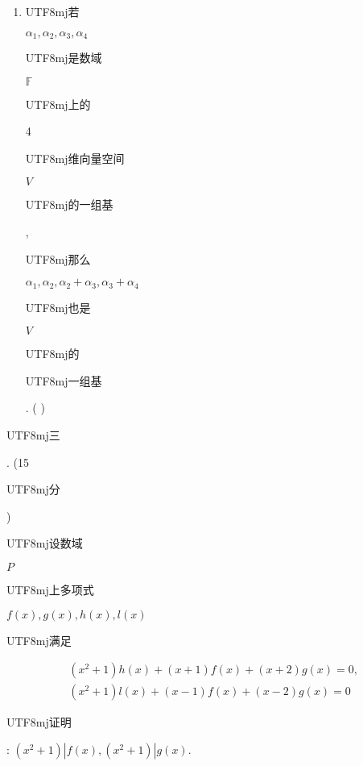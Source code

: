 \documentclass[10pt]{article}
\begin{document}
\begin{enumerate}
  \item \begin{CJK}{UTF8}{mj}若\end{CJK} $\alpha_{1}, \alpha_{2}, \alpha_{3}, \alpha_{4}$ \begin{CJK}{UTF8}{mj}是数域\end{CJK} $\mathbb{F}$ \begin{CJK}{UTF8}{mj}上的\end{CJK} 4 \begin{CJK}{UTF8}{mj}维向量空间\end{CJK} $V$ \begin{CJK}{UTF8}{mj}的一组基\end{CJK}, \begin{CJK}{UTF8}{mj}那么\end{CJK} $\alpha_{1}, \alpha_{2}, \alpha_{2}+\alpha_{3}, \alpha_{3}+\alpha_{4}$ \begin{CJK}{UTF8}{mj}也是\end{CJK} $V$ \begin{CJK}{UTF8}{mj}的\end{CJK} \begin{CJK}{UTF8}{mj}一组基\end{CJK}. ( )

\end{enumerate}
\begin{CJK}{UTF8}{mj}三\end{CJK}. (15 \begin{CJK}{UTF8}{mj}分\end{CJK}) \begin{CJK}{UTF8}{mj}设数域\end{CJK} $P$ \begin{CJK}{UTF8}{mj}上多项式\end{CJK} $f(x), g(x), h(x), l(x)$ \begin{CJK}{UTF8}{mj}满足\end{CJK}
$$
\begin{aligned}
&\left(x^{2}+1\right) h(x)+(x+1) f(x)+(x+2) g(x)=0, \\
&\left(x^{2}+1\right) l(x)+(x-1) f(x)+(x-2) g(x)=0
\end{aligned}
$$
\begin{CJK}{UTF8}{mj}证明\end{CJK}: $\left(x^{2}+1\right)\left|f(x),\left(x^{2}+1\right)\right| g(x)$.
\end{document}
